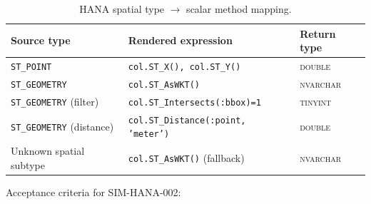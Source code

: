 \begin{table}[H]
\centering\footnotesize
\caption{HANA spatial type $\to$ scalar method mapping.}
\label{tab:sim-hana-spatial-mapping}
\begin{tabularx}{\linewidth}{@{}l l X@{}}
\toprule
\textbf{Source type} & \textbf{Rendered expression} & \textbf{Return type} \\ \midrule
\texttt{ST\_POINT} & \texttt{col.ST\_X(), col.ST\_Y()} & \textsc{double} \\
\texttt{ST\_GEOMETRY} & \texttt{col.ST\_AsWKT()} & \textsc{nvarchar} \\
\texttt{ST\_GEOMETRY} (filter) & \texttt{col.ST\_Intersects(:bbox)=1} & \textsc{tinyint} \\
\texttt{ST\_GEOMETRY} (distance) & \texttt{col.ST\_Distance(:point, 'meter')} & \textsc{double} \\
Unknown spatial subtype & \texttt{col.ST\_AsWKT()} (fallback) & \textsc{nvarchar} \\
\bottomrule
\end{tabularx}
\end{table}

\noindent
Acceptance criteria for SIM-HANA-002:

